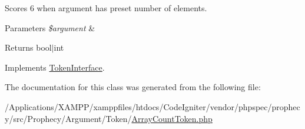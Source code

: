 Scores 6 when argument has preset number of elements.


\begin{DoxyParams}{Parameters}
{\em \$argument} & \\
\hline
\end{DoxyParams}
\begin{DoxyReturn}{Returns}
bool$\vert$int 
\end{DoxyReturn}


Implements \mbox{\hyperlink{interface_prophecy_1_1_argument_1_1_token_1_1_token_interface_a8d5bf47ab6eaa935458d5ad160e52822}{Token\+Interface}}.



The documentation for this class was generated from the following file\+:\begin{DoxyCompactItemize}
\item 
/\+Applications/\+X\+A\+M\+P\+P/xamppfiles/htdocs/\+Code\+Igniter/vendor/phpspec/prophecy/src/\+Prophecy/\+Argument/\+Token/\mbox{\hyperlink{_array_count_token_8php}{Array\+Count\+Token.\+php}}\end{DoxyCompactItemize}
